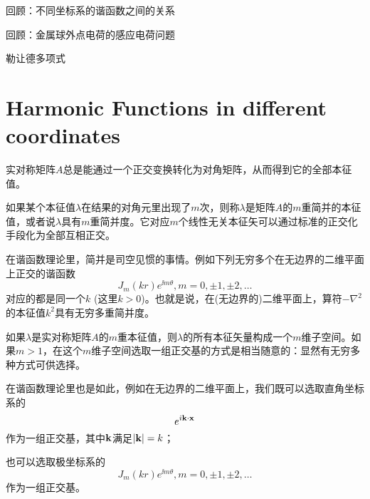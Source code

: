 \documentclass[CJK]{beamer}
\date{}
\begin{document}

\begin{frame}
\bch
\bitem
\item{回顾：不同坐标系的谐函数之间的关系}
\item{回顾：金属球外点电荷的感应电荷问题}
\item{勒让德多项式}
\eitem
\ech
\end{frame}

\section{Harmonic Functions in different coordinates}

\begin{frame}
  \bch
  实对称矩阵$A$总是能通过一个正交变换转化为对角矩阵，从而得到它的全部本征值。

  \skiplines
  
  如果某个本征值$\lambda$在结果的对角元里出现了$m$次，则称$\lambda$是矩阵$A$的$m$重简并的本征值，或者说$\lambda$具有$m$重简并度。它对应$m$个线性无关本征矢可以通过标准的正交化手段化为全部互相正交。

  \skiplines
  
  在谐函数理论里，简并是司空见惯的事情。例如下列无穷多个在无边界的二维平面上正交的谐函数
  $$J_m(kr)e^{\ii m \theta}, m=0,\pm 1, \pm 2, \ldots $$
  对应的都是同一个$k$ (这里$k>0$)。也就是说，在(无边界的)二维平面上，算符$-\nabla^2$的本征值$k^2$具有无穷多重简并度。
  
  \ech
\end{frame}



\begin{frame}
  \bch
  如果$\lambda$是实对称矩阵$A$的$m$重本征值，则$\lambda$的所有本征矢量构成一个$m$维子空间。如果$m>1$，在这个$m$维子空间选取一组正交基的方式是相当随意的：显然有无穷多种方式可供选择。

  \skiplines

  在谐函数理论里也是如此，例如在无边界的二维平面上，我们既可以选取直角坐标系的
  $$e^{{\dot{\imath}} {\mathbf{k}}\cdot{\mathbf{x}}}$$
  作为一组正交基，其中${\mathbf{k}}$满足$|{\mathbf{k}}|=k$；

  也可以选取极坐标系的
  $$J_m(kr)e^{\ii m \theta}, m=0,\pm 1, \pm 2, \ldots $$
  作为一组正交基。
  \ech
\end{frame}
\end{document}
